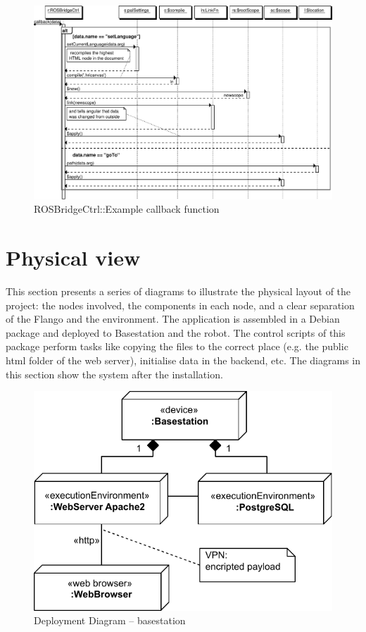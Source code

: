 \begin{figure}
    \centering
    \includegraphics{figures/design/seqdia/ROSBridgeCtrl-callback.pdf}
    \caption{ROSBridgeCtrl::Example callback function}
    \label{fig:design-seqdia-ROSBridgeCtrl-callback}
\end{figure}

\FloatBarrier

\section{Physical view}
This section presents a series of diagrams to illustrate the physical layout of the project: the nodes involved, the components in each node, and a clear separation of the Flango \cm and the environment.
The application is assembled in a Debian package and deployed to Basestation and the robot.
The control scripts of this package perform tasks like copying the files to the correct place (e.g. the public html folder of the web server), initialise data in the backend, etc.
The diagrams in this section show the system after the installation.

\begin{figure}[htb]
    \centering
    \includegraphics{figures/design-deployment-basestation.pdf}
    \caption{Deployment Diagram -- basestation}
    \label{fig:deploy-basestation}
\end{figure}

